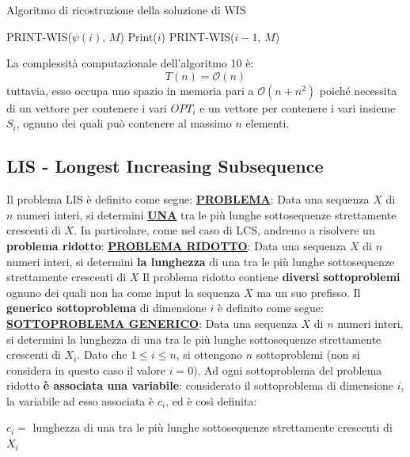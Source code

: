 \documentclass[12pt]{article}
\begin{document}
\begin{algorithm}[H]
    \caption{Algoritmo di ricostruzione della soluzione di WIS}
    \DontPrintSemicolon
     {
         {
             {
                PRINT-WIS($\psi(i)$, $M$) \;
                Print($i$)
            } {
                PRINT-WIS($i-1$, $M$)
            }
        }
    }
\end{algorithm} \noindent
La complessità computazionale dell'algoritmo 10 è:
$$T(n) = \mathcal{O}(n)$$
tuttavia, esso occupa uno spazio in memoria pari a $\mathcal{O}(n + n^2)$ poiché necessita
di un vettore per contenere i vari $OPT_i$ e un vettore per contenere i vari insieme $S_i$, ognuno dei quali può contenere
al massimo $n$ elementi.
\subsection{LIS - Longest Increasing Subsequence}
Il problema LIS è definito come segue: \newline
\textbf{\underline{PROBLEMA}}: Data una sequenza $X$ di $n$ numeri interi, si determini \textbf{\underline{UNA}} tra le più lunghe sottosequenze strettamente crescenti di $X$. \newline
In particolare, come nel caso di LCS, andremo a risolvere un \textbf{problema ridotto}: \newline
\textbf{\underline{PROBLEMA RIDOTTO}}: Data una sequenza $X$ di $n$ numeri interi, si determini \textbf{la lunghezza} di una tra le più lunghe sottosequenze strettamente crescenti di $X$ \newline
Il problema ridotto contiene \textbf{diversi sottoproblemi} ognuno dei quali non ha come input la sequenza $X$ ma un suo prefisso.
Il \textbf{generico sottoproblema} di dimensione $i$ è definito come segue: \newline
\textbf{\underline{SOTTOPROBLEMA GENERICO}}: Data una sequenza $X$ di $n$ numeri interi, si determini la lunghezza di una tra le più lunghe sottosequenze strettamente crescenti di $X_i$. \newline
Dato che $1 \leq i \leq n$, si ottengono $n$ sottoproblemi (non si considera in questo caso il valore $i = 0$). Ad ogni sottoproblema del problema ridotto \textbf{è associata una variabile}: considerato il 
sottoproblema di dimensione $i$, la variabile ad esso associata è $c_i$, ed è così definita:
\begin{center}
    $c_i =$ lunghezza di una tra le più lunghe sottosequenze strettamente crescenti di $X_i$
\end{center}
\end{document}
